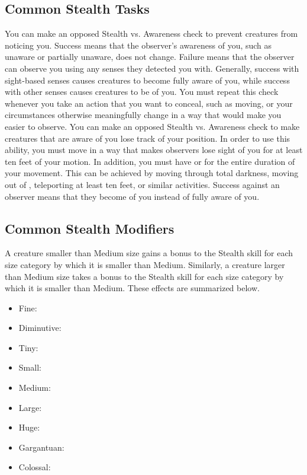     \subsection{Common Stealth Tasks}
         You can make an opposed Stealth vs. Awareness check to prevent creatures from noticing you.
        Success means that the observer's awareness of you, such as unaware or partially unaware, does not change.
        Failure means that the observer can observe you using any senses they detected you with.
        Generally, success with sight-based senses causes creatures to become fully aware of you, while success with other senses causes creatures to be \partiallyunaware of you.
        You must repeat this check whenever you take an action that you want to conceal, such as moving, or your circumstances otherwise meaningfully change in a way that would make you easier to observe.
         You can make an opposed Stealth vs. Awareness check to make creatures that are aware of you lose track of your position.
        In order to use this ability, you must move in a way that makes observers lose sight of you for at least ten feet of your motion.
        In addition, you must have  or  for the entire duration of your movement.
        This can be achieved by moving through total darkness, moving out of , teleporting at least ten feet, or similar activities.
        Success against an observer means that they become \partiallyunaware of you instead of fully aware of you.

    \subsection{Common Stealth Modifiers}\label{Common Stealth Modifiers}

        A creature smaller than Medium size gains a  bonus to the Stealth skill for each size category by which it is smaller than Medium.
        Similarly, a creature larger than Medium size takes a  bonus to the Stealth skill for each size category by which it is smaller than Medium.
        These effects are summarized below.
            \begin{itemize}
                \item Fine: 
                \item Diminutive: 
                \item Tiny: 
                \item Small: 
                \item Medium: 
                \item Large: 
                \item Huge: 
                \item Gargantuan: 
                \item Colossal: 
            \end{itemize}

